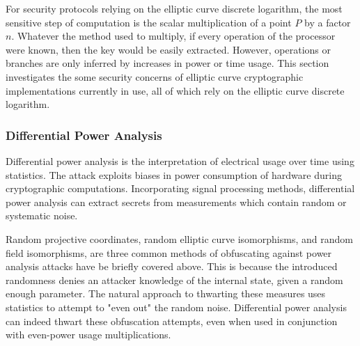\documentclass{article}
\begin{document}
    For security protocols relying on the elliptic curve discrete logarithm,
    the most sensitive step of computation is the scalar multiplication of a
    point $P$ by a factor $n$. Whatever the method used to multiply, if every
    operation of the processor were known, then the key would be easily
    extracted. However, operations or branches are only inferred by increases
    in power or time usage.  This section investigates the some security
    concerns of elliptic curve cryptographic implementations currently in use,
    all of which rely on the elliptic curve discrete logarithm.

\subsubsection{Differential Power Analysis}
    Differential power analysis is the interpretation of electrical usage over
    time using statistics. The attack exploits biases in power consumption of
    hardware during cryptographic computations. Incorporating signal processing
    methods, differential power analysis can extract secrets from measurements
    which contain random or systematic noise. 

    Random projective coordinates, random elliptic curve isomorphisms, and
    random field isomorphisms, are three common methods of obfuscating against
    power analysis attacks have be briefly covered above. This is because the
    introduced randomness denies an attacker knowledge of the internal state,
    given a random enough parameter. The natural approach to thwarting these
    measures uses statistics to attempt to "even out" the random noise.
    Differential power analysis can indeed thwart these obfuscation attempts,
    even when used in conjunction with even-power usage multiplications.
\end{document}
